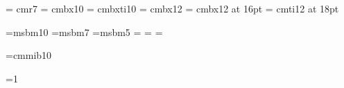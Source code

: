 
\font\small = cmr7
\font\sxmplbx = cmbx10 
\font\sxmplbxti = cmbxti10 
\font\xmplbx = cmbx12 %
\font\mxmplbx = cmbx12 at 16pt
\font\bxmplbx = cmti12 at 18pt %

\font\tenamsb=msbm10 \font\sevenamsb=msbm7 \font\fiveamsb=msbm5
\newfam\bbfam
\textfont\bbfam=\tenamsb
\scriptfont\bbfam=\sevenamsb
\scriptscriptfont\bbfam=\fiveamsb

\font\tenbi=cmmib10
\def\bi#1{\hbox{\tenbi#1}}

\def\ft#1#2{\footnote {\kern 0.5pt {\raise 3.5pt \hbox{\small #1}}}{#2}}

\def\bbb{\fam\bbfam}

\def\E#1{%
{\bbb E}\left[#1\right]
}

\def\title#1{%
{\bxmplbx {\centerline {#1}}}
\vskip .2in
  {\leftskip = 2.5in%
  \par\noindent\llap{\hbox to 2.5in{\hfil {\bf Author:} }}{\it R. Scott
  McIntire}\par\noindent {\it Financial Engineering}%
  }%
\vskip .1in
 {\leftskip = 2.5in%
  \par\noindent\llap{\hbox to 2.5in{\hfil {\bf Date:} }} \date \par%
  }%
\vskip .25in
\hrule height 1pt
\vskip .1in
}

\def\section#1{\vskip .5in \centerline{\mxmplbx #1} \bigskip}

\def\subsection#1{\vskip .25 in \leftline{\xmplbx #1} \medskip}

=1
\def\chapter#1{%
\vfil
\supereject
{\bxmplbx {\centerline {Chapter \number\count3: #1}}}
\vskip .2in
\hrule height 1pt
\vskip .2in
\ifnum \count3 = 1 \pageno=1 \fi
\global\advance\count3 by 1
}%

